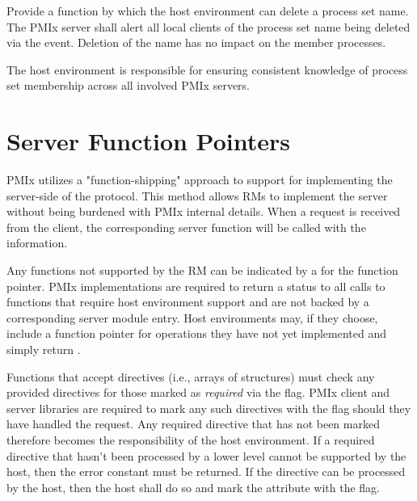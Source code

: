 
\begin{arglist}
\end{arglist}

\returnsimple

\descr

Provide a function by which the host environment can delete a process set name.
The \ac{PMIx} server shall alert all local clients of the process set name
being deleted via the  event. Deletion of the name has no impact on the member processes.

\advicermstart
The host environment is responsible for ensuring consistent knowledge of
process set membership across all involved \ac{PMIx} servers.
\advicermend


\section{Server Function Pointers}

\ac{PMIx} utilizes a "function-shipping" approach to support for implementing the server-side of the protocol. This method allows \acp{RM} to implement the server without being burdened with \ac{PMIx} internal details. When a request is received from the client, the corresponding server function will be called with the information.

Any functions not supported by the \ac{RM} can be indicated by a  for the function pointer. \ac{PMIx} implementations are required to return a  status to all calls to functions that require host environment support and are not backed by a corresponding server module entry. Host environments may, if they choose, include a function pointer for operations they have not yet implemented and simply return .

Functions that accept directives (i.e., arrays of  structures) must check any provided directives for those marked as \emph{required} via the  flag. \ac{PMIx} client and server libraries are required to mark any such directives with the  flag should they have handled the request. Any required directive that has not been marked therefore becomes the responsibility of the host environment. If a required directive that hasn't been processed by a lower level cannot be supported by the host, then the  error constant must be returned. If the directive can be processed by the host, then the host shall do so and mark the attribute with the  flag.

